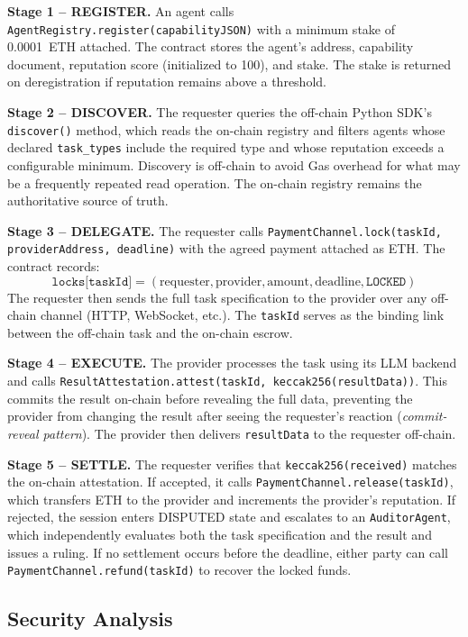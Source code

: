 \documentclass[conference]{IEEEtran}
\begin{document}
\textbf{Stage 1 -- REGISTER.}
An agent calls \texttt{AgentRegistry.register(capabilityJSON)} with a
minimum stake of 0.0001~ETH attached.  The contract stores the agent's
address, capability document, reputation score (initialized to 100),
and stake.  The stake is returned on deregistration if reputation
remains above a threshold.

\textbf{Stage 2 -- DISCOVER.}
The requester queries the off-chain Python SDK's \texttt{discover()}
method, which reads the on-chain registry and filters agents whose
declared \texttt{task\_types} include the required type and whose
reputation exceeds a configurable minimum.  Discovery is off-chain to
avoid Gas overhead for what may be a frequently repeated read
operation.  The on-chain registry remains the authoritative source of
truth.

\textbf{Stage 3 -- DELEGATE.}
The requester calls
\texttt{PaymentChannel.lock(taskId, providerAddress, deadline)}
with the agreed payment attached as ETH.  The contract records:
\[\texttt{locks[taskId]} = (\text{requester}, \text{provider}, \text{amount}, \text{deadline}, \texttt{LOCKED})\]
The requester then sends the full task specification to the provider
over any off-chain channel (HTTP, WebSocket, etc.).  The \texttt{taskId}
serves as the binding link between the off-chain task and the on-chain
escrow.

\textbf{Stage 4 -- EXECUTE.}
The provider processes the task using its LLM backend and calls
\texttt{ResultAttestation.attest(taskId, keccak256(resultData))}.
This commits the result on-chain before revealing the full data,
preventing the provider from changing the result after seeing the
requester's reaction (\emph{commit-reveal pattern}).  The provider
then delivers \texttt{resultData} to the requester off-chain.

\textbf{Stage 5 -- SETTLE.}
The requester verifies that \texttt{keccak256(received)} matches the
on-chain attestation.  If accepted, it calls
\texttt{PaymentChannel.release(taskId)}, which transfers ETH to the
provider and increments the provider's reputation.  If rejected, the
session enters DISPUTED state and escalates to an \texttt{AuditorAgent},
which independently evaluates both the task specification and the
result and issues a ruling.  If no settlement occurs before the
deadline, either party can call \texttt{PaymentChannel.refund(taskId)}
to recover the locked funds.

\subsection{Security Analysis}
\end{document}
